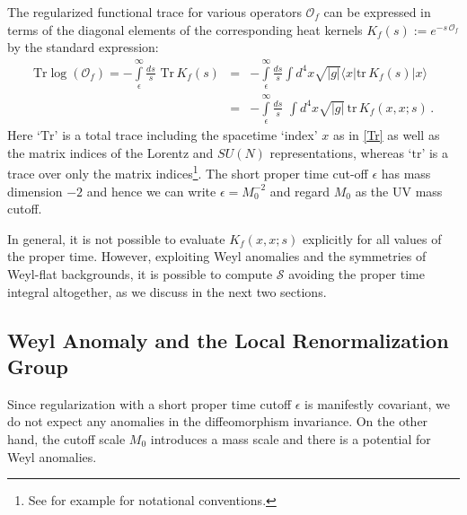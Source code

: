 \documentclass[12pt,a4paper]{article}
\newcommand{\bea}{\begin{eqnarray}}
\newcommand{\eea}{\end{eqnarray}}
\newcommand{\cO}{\mathcal{O}}
\newcommand{\cS}{\mathcal{S}}
\newcommand{\e}{\epsilon}
\newcommand{\1}{{\textbf{1}}}
\newcommand{\Tr}{\mbox{Tr}}
\newcommand{\tr}{\mbox{tr}}
\newcommand{\+}{{\,+ \,}}
\begin{document}
The regularized functional trace for various operators $\cO_{f}$ can be expressed in terms of the diagonal elements of the corresponding heat kernels 
$K_{f}(s) := e^{-s \,\cO_{f}}$
by the standard expression:
\bea\label{trlog2}
\Tr \log\left(\cO_f\right) = -\int\limits_\e^\infty \frac{ds}{s} \,\, \Tr \,K_{f}(s)  &=&  - \int\limits_\e^\infty \frac{ds}{s}\int d^4x \sqrt{|g|} \langle x| \tr \, K_{f}(s)|x \rangle \nonumber \\
&=& -\int\limits_\e^\infty \frac{ds}{s} \,\,\int d^4x \sqrt{|g|}\,  \tr \, K_{f}(x,x;s)\, .
\eea
Here `$\Tr $’ is a total trace  including the spacetime `index’ $x$ as in \eqref{Tr}  as well as the matrix indices of the Lorentz and $SU(N)$ representations,  whereas `$\tr$’ is a trace over only  the matrix indices\footnote{See for example \cite{Percacci:2017fkn, Vassilevich:2003xt} for notational conventions.}.
The short proper time cut-off $\e$ has mass dimension $-2$ and hence we can write $\e= M_{0}^{-2}$ and regard $M_{0}$ as the UV mass cutoff. 


In general,  it is not possible to evaluate  $K_{f}(x,x;s)$ explicitly for all values of the proper time. 
However, exploiting  Weyl anomalies and the symmetries of Weyl-flat backgrounds, it is possible to compute $\cS$ avoiding the proper time integral altogether, as we discuss in the next two sections.

\subsection{Weyl Anomaly and the Local Renormalization Group}

Since regularization with a short proper time cutoff $\e$ is manifestly covariant, we do not expect any anomalies in the diffeomorphism invariance. On the other hand, the cutoff scale $M_{0}$  introduces a mass scale  and there is a potential for Weyl anomalies.
\end{document}
